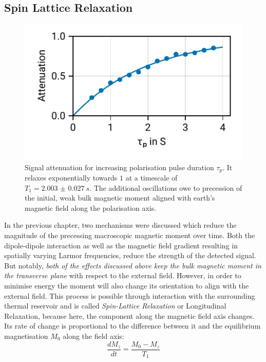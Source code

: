 \documentclass[
    parskip=half, 
    twoside=false,
    twocolumn=true,
    fontsize=11pt,
]{scrarticle}
\begin{document}
\subsection{Spin Lattice Relaxation}
\begin{figure}
    \centering
    \includegraphics{figures/03 T1.pdf}
    \caption{Signal attenuation for increasing polarisation pulse duration $\tau_p$. It relaxes exponentially towards $1$ at a timescale of $T_1 = \SI{2.003(27)}{s}$. The additional oscillations owe to precession of the initial, weak bulk magnetic moment aligned with earth's magnetic field along the polarisation axis.}
    \label{fig:spin-lattice}
\end{figure}
In the previous chapter, two mechanisms were discussed which reduce the magnitude of the precessing macroscopic magnetic moment over time. Both the dipole-dipole interaction as well as the magnetic field gradient resulting in spatially varying Larmor frequencies, reduce the strength of the detected signal. But notably, \textit{both of the effects discussed above keep the bulk magnetic moment in the transverse plane} with respect to the external field. However, in order to minimise energy the moment will also change its orientation to align with the external field. This process is possible through interaction with the surrounding thermal reservoir and is called \textit{Spin-Lattice Relaxation} or Longitudinal Relaxation, because here, the component along the magnetic field axis changes. Its rate of change is proportional to the difference between it and the equilibrium magnetisation $M_0$ along the field axis:
\begin{equation}
 \frac{dM_z}{dt} = \frac{M_0 - M_z}{T_1}
\end{equation}
\end{document}
